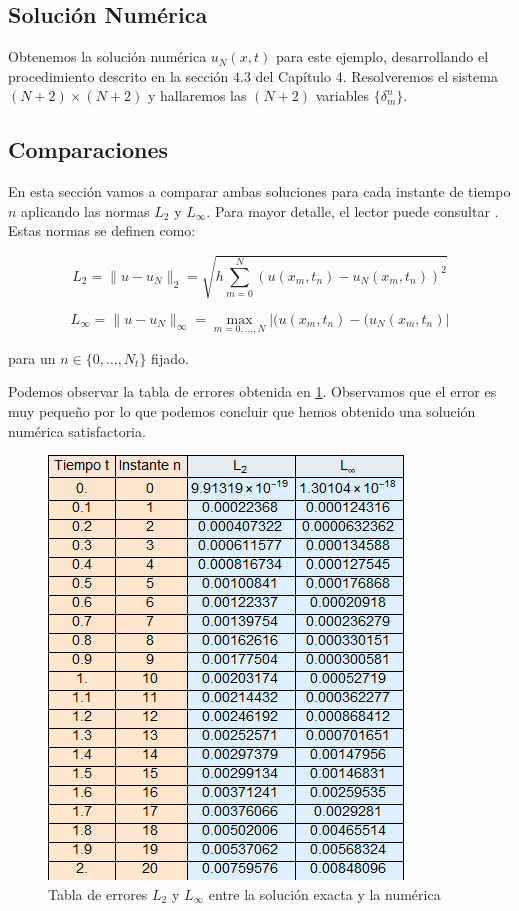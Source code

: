 \subsection{Solución Numérica}

Obtenemos la solución numérica $u_{N}(x,t)$ para este ejemplo, desarrollando el procedimiento descrito en la sección $4.3$ del Capítulo 4. Resolveremos el sistema $(N+2)\times(N+2)$ y hallaremos las $(N+2)$ variables $\{\delta_{m}^{n}\}$.

 \newpage

\subsection{Comparaciones}

En esta sección vamos a comparar ambas soluciones para cada instante de tiempo $n$ aplicando las normas $L_{2}$ y $L_{\infty}$. Para mayor detalle, el lector puede consultar \cite{norma}. Estas normas se definen como:

\begin{equation}
    L_{2}=\|u-u_{N}\|_{2}=\sqrt{h\sum_{m=0}^{N}(u(x_{m},t_{n})-u_{N}(x_{m},t_{n}))^2}
\end{equation}\label{Norma2}

\begin{equation}
    L_{\infty}=\|u-u_{N}\|_{\infty}=\max_{m=0,\ldots,N}|(u(x_{m},t_{n})-(u_{N}(x_{m},t_{n})|
\end{equation}\label{Normainfinito}

\noindent para un $n\in \{0,\ldots,N_{t}\}$ fijado.

Podemos observar la tabla de errores obtenida en \ref{fig:TablaErrores}. Observamos que el error es muy pequeño por lo que podemos concluir que hemos obtenido una solución numérica satisfactoria.

\begin{figure}
  \centering
    \includegraphics{error nuevo.png}
  \caption{Tabla de errores $L_{2}$ y $L_{\infty}$ entre la solución exacta y la numérica}
  \label{fig:TablaErrores}
\end{figure}

